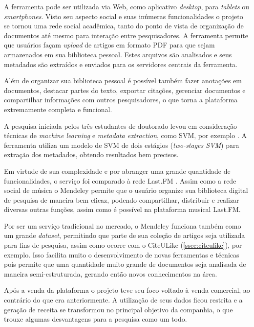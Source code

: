 A ferramenta pode ser utilizada via Web, como aplicativo \emph{desktop}, para \emph{tablets} ou \emph{smartphones}. Visto seu aspecto social e suas inúmeras funcionalidades o projeto se tornou uma rede social acadêmica, tanto do ponto de vista de organização de documentos até mesmo para interação entre pesquisadores. A ferramenta permite que usuários façam \emph{upload} de artigos em formato PDF para que sejam armazenados em sua biblioteca pessoal. Estes arquivos são analisados e seus metadados são extraídos e enviados para os servidores centrais da ferramenta.

Além de organizar sua biblioteca pessoal é possível também fazer anotações em documentos, destacar partes do texto, exportar citações, gerenciar documentos e compartilhar informações com outros pesquisadores, o que torna a plataforma extremamente completa e funcional.

A pesquisa iniciada pelos três estudantes de doutorado levou em consideração técnicas de \emph{machine learning} e \emph{metadata extraction}, como SVM, por exemplo \cite{Granitzer-2012-LayoutBased}. A ferramenta utiliza um modelo de SVM de dois estágios (\emph{two-stages SVM}) \cite{Han-SVM} para extração dos metadados, obtendo resultados bem precisos.

Em virtude de sua complexidade e por abranger uma grande quantidade de funcionalidades, o serviço foi comparado à rede Last.FM \cite{Mendeley-LastFM}. Assim como a rede social de música o Mendeley permite que o usuário organize sua biblioteca digital de pesquisa de maneira bem eficaz, podendo compartilhar, distribuir e realizar diversas outras funções, assim como é possível na plataforma musical Last.FM.

Por ser um serviço tradicional no mercado, o Mendeley funciona também como um grande \emph{dataset}, permitindo que parte de sua coleção de artigos seja utilizada para fins de pesquisa, assim como ocorre com o CiteULike (\autoref{ssec:citeulike}), por exemplo. Isso facilita muito o desenvolvimento de novas ferramentas e técnicas pois permite que uma quantidade muito grande de documentos seja analisada de maneira semi-estruturada, gerando então novos conhecimentos na área.

Após a venda da plataforma o projeto teve seu foco voltado à venda comercial, ao contrário do que era anteriormente. A utilização de seus dados ficou restrita e a geração de receita se transformou no principal objetivo da companhia, o que trouxe algumas desvantagens para a pesquisa como um todo.

